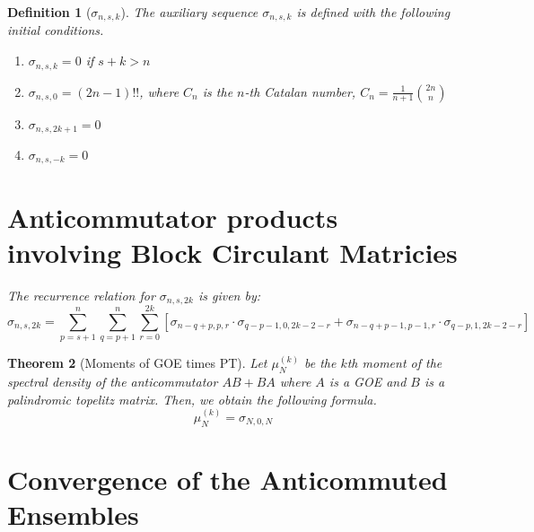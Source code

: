 \documentclass[12pt,reqno]{amsart}
\theoremstyle{plain} %
\newtheorem{theorem}{Theorem}[section]
\newtheorem{definition}[theorem]{Definition}
\theoremstyle{remark}
\theoremstyle{definition}
\begin{document}
\begin{definition}[\(\sigma_{n, s, k}\)]
The auxiliary sequence \(\sigma_{n, s, k}\) is defined with the following initial conditions. 
\begin{enumerate}
    \item \(\sigma_{n, s, k} = 0\) if \(s + k > n\)
    \item \(\sigma_{n, s, 0} = (2n - 1)!!\), where \(C_n\) is the \(n\)-th Catalan number, \(C_n = \frac{1}{n + 1} \binom{2n}{n}\)
    \item \(\sigma_{n, s, 2k + 1} = 0\)
    \item \(\sigma_{n, s, -k} = 0\)
\end{enumerate}

\section{Anticommutator products involving Block Circulant Matricies}

The recurrence relation for \(\sigma_{n, s, 2k}\) is given by:
\[
\sigma_{n, s, 2k} = 
\sum_{p = s + 1}^{n} 
\sum_{q = p + 1}^{n}
\sum_{r = 0}^{2k}
\left[
\sigma_{n - q + p, p, r} \cdot \sigma_{q - p - 1, 0, 2k - 2 - r}
+ 
\sigma_{n - q + p - 1, p - 1, r} \cdot \sigma_{q - p, 1, 2k - 2 - r}
\right]
\]
\end{definition}

\begin{theorem}[Moments of GOE times PT]
Let $\mu^{(k)}_N$ be the $k$th moment of the spectral density of 
the anticommutator $AB + BA$ where $A$ is a GOE and $B$ is 
a palindromic topelitz matrix. Then, we obtain the following formula. 
\[
    \mu^{(k)}_N = \sigma_{N, 0, N}
\]
\end{theorem}

\section{Convergence of the Anticommuted Ensembles}
\end{document}
